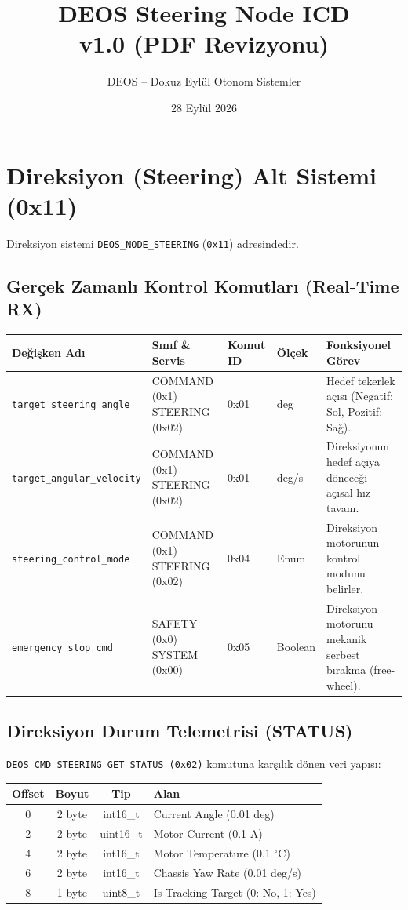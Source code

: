 \documentclass[a4paper,10pt]{article}
\title{\textbf{DEOS Steering Node ICD}\\
\large v1.0 (PDF Revizyonu)}
\author{DEOS -- Dokuz Eylül Otonom Sistemler}
\date{28 Eylül 2026}
\newcommand{\hex}[1]{\texttt{0x#1}}
\newcommand{\code}[1]{\texttt{#1}}
\begin{document}
\maketitle

\section{Direksiyon (Steering) Alt Sistemi (0x11)}

Direksiyon sistemi \code{DEOS\_NODE\_STEERING} (\hex{11}) adresindedir.

\subsection{Gerçek Zamanlı Kontrol Komutları (Real-Time RX)}
\begin{center}
\begin{tabularx}{\textwidth}{>{\raggedright\arraybackslash}p{3.8cm} >{\raggedright\arraybackslash}p{3cm} >{\raggedright\arraybackslash}p{2.2cm} >{\raggedright\arraybackslash}p{2.2cm} X}
\toprule
\textbf{Değişken Adı} & \textbf{Sınıf \& Servis} & \textbf{Komut ID} & \textbf{Ölçek} & \textbf{Fonksiyonel Görev} \\
\midrule
\code{target\_steering\_angle} & COMMAND (0x1) STEERING (0x02) & 0x01 & 0.01 deg & Hedef tekerlek açısı (Negatif: Sol, Pozitif: Sağ). \\
\code{target\_angular\_velocity} & COMMAND (0x1) STEERING (0x02) & 0x01 & 0.01 deg/s & Direksiyonun hedef açıya döneceği açısal hız tavanı. \\
\code{steering\_control\_mode} & COMMAND (0x1) STEERING (0x02) & 0x04 & Enum & Direksiyon motorunun kontrol modunu belirler. \\
\code{emergency\_stop\_cmd} & SAFETY (0x0) SYSTEM (0x00) & 0x05 & Boolean & Direksiyon motorunu mekanik serbest bırakma (free-wheel). \\
\bottomrule
\end{tabularx}
\end{center}

\subsection{Direksiyon Durum Telemetrisi (STATUS)}

\code{DEOS\_CMD\_STEERING\_GET\_STATUS (0x02)} komutuna karşılık dönen veri yapısı:

\begin{center}
\begin{tabular}{c c c l}
\toprule
\textbf{Offset} & \textbf{Boyut} & \textbf{Tip} & \textbf{Alan} \\
\midrule
0 & 2 byte & int16\_t  & Current Angle (0.01 deg) \\
2 & 2 byte & uint16\_t & Motor Current (0.1 A) \\
4 & 2 byte & int16\_t  & Motor Temperature (0.1 $^\circ$C) \\
6 & 2 byte & int16\_t  & Chassis Yaw Rate (0.01 deg/s) \\
8 & 1 byte & uint8\_t  & Is Tracking Target (0: No, 1: Yes) \\
\bottomrule
\end{tabular}
\end{center}
\end{document}
